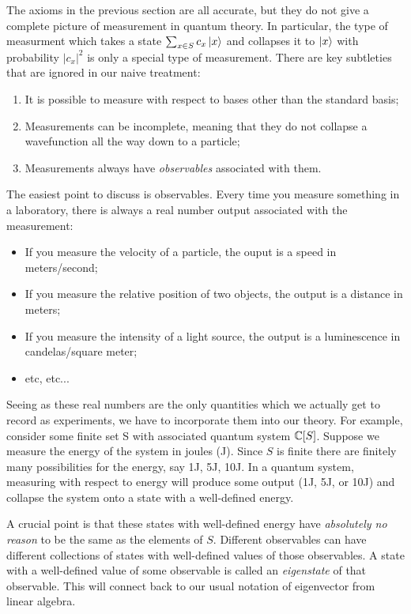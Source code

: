 The axioms in the previous section are all accurate, but they do not give a complete picture of measurement in quantum theory. In particular, the type of measurment which takes a state $\sum_{x\in S}c_x \ket{x}$ and collapses it to $\ket{x}$ with probability $|c_x|^2$ is only a special type of measurement. There are key subtleties that are ignored in our naive treatment:

\begin{enumerate}
\item It is possible to measure with respect to bases other than the standard basis;
\item Measurements can be incomplete, meaning that they do not collapse a wavefunction all the way down to a particle;
\item Measurements always have \textit{observables} associated with them.
\end{enumerate}

The easiest point to discuss is observables. Every time you measure something in a laboratory, there is always a real number output associated with the measurement:

\begin{itemize}
\item If you measure the velocity of a particle, the ouput is a speed in meters/second;
\item If you measure the relative position of two objects, the output is a distance in meters;
\item If you measure the intensity of a light source, the output is a luminescence in candelas/square meter;
\item etc, etc...
\end{itemize}

Seeing as these real numbers are the only quantities which we actually get to record as experiments, we have to incorporate them into our theory. For example, consider some finite set S with associated quantum system $\mathbb{C}[S]$. Suppose we measure the energy of the system in joules (J). Since $S$ is finite there are finitely many possibilities for the energy, say 1J, 5J, 10J. In a quantum system, measuring with respect to energy will produce some output (1J, 5J, or 10J) and collapse the system onto a state with a well-defined energy.

A crucial point is that these states with well-defined energy have \textit{absolutely no reason} to be the same as the elements of $S$. Different observables can have different collections of states with well-defined values of those observables. A state with a well-defined value of some observable is called an \textit{eigenstate} of that observable. This will connect back to our usual notation of eigenvector from linear algebra.

